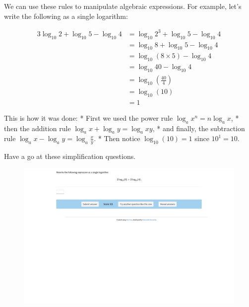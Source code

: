 \documentclass[
  a4paper,
]{scrbook}
\begin{document}
We can use these rules to manipulate algebraic expressions. For example,
let's write the following as a single logarithm:

\[
\begin{aligned}
3\log_{10} 2 + \log_{10} 5 - \log_{10} 4 &= \log_{10} 2^3 + \log_{10} 5 -  \log_{10} 4 \\
&= \log_{10} 8 + \log_{10} 5 -  \log_{10} 4 \\
&= \log_{10} (8 \times 5)  -  \log_{10} 4 \\
&= \log_{10} 40  -  \log_{10} 4 \\
&= \log_{10} (\frac{40}{4}) \\
&= \log_{10} (10) \\
&= 1
\end{aligned}
\]

This is how it was done: * First we used the power rule
\(\log_{a} x^n = n\log_{a} x\), * then the addition rule
\(\log_{a} x + \log_{a} y = \log_{a} xy\), * and finally, the
subtraction rule \(\log_{a} x - \log_{a} y = \log_{a}{\frac{x}{y}}\). *
Then notice \(\log_{10} (10)= 1\) since \(10^1=10\).

Have a go at these simplification questions.

\begin{figure}

{\centering 

\href{https://numbas.mathcentre.ac.uk/question/98284/logarithms-simplifying-expressions-2/embed/?token=236a0071-445b-43bf-a8a9-9611b4dcb5ae}{\includegraphics{./11-logarithms_files/figure-pdf/unnamed-chunk-1-1.png}}

}

\end{figure}
\end{document}
